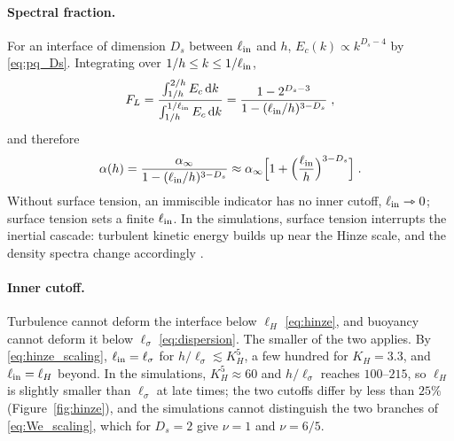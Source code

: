 \documentclass[11pt]{article}
\numberwithin{equation}{section}
\newcommand{\ls}{\ell_\sigma}
\begin{document}
\paragraph{Spectral fraction.} For an interface of dimension $D_s$ between $\ell_{\rm in}$ and $h$, $E_c(k) \propto k^{D_s - 4}$ by \eqref{eq:pq_Ds}. Integrating over $1/h \le k \le 1/\ell_{\rm in}$,
\begin{equation}\label{eq:FL}
F_L = \frac{\int_{1/h}^{2/h} E_c \, \mathrm d k}{\int_{1/h}^{1/\ell_{\rm in}} E_c \, \mathrm d k}
= \frac{1 - 2^{D_s - 3}}{1 - (\ell_{\rm in}/h)^{3 - D_s}} \;,
\end{equation}
and therefore
\begin{equation}\label{eq:alpha_closure}
\alpha(h) = \frac{\alpha_\infty}{1 - (\ell_{\rm in}/h)^{3 - D_s}} \approx
\alpha_\infty \Big[1 + \Big(\frac{\ell_{\rm in}}{h}\Big)^{3 - D_s}\Big] \;.
\end{equation}
Without surface tension, an immiscible indicator has no inner cutoff, $\ell_{\rm in} \rightarrowtriangle 0$; surface tension sets a finite $\ell_{\rm in}$. In the simulations, surface tension interrupts the inertial cascade: turbulent kinetic energy builds up near the Hinze scale, and the density spectra change accordingly \cite{Walker2027_2}.

\paragraph{Inner cutoff.} Turbulence cannot deform the interface below $\ell_H$ \eqref{eq:hinze}, and buoyancy cannot deform it below $\ls$ \eqref{eq:dispersion}. The smaller of the two applies. By \eqref{eq:hinze_scaling}, $\ell_{\rm in} = \ls$ for $h/\ls \lesssim K_H^5$, a few hundred for $K_H = 3.3$, and $\ell_{\rm in} = \ell_H$ beyond. In the simulations, $K_H^5 \approx 60$ and $h/\ls$ reaches $100$--$215$, so $\ell_H$ is slightly smaller than $\ls$ at late times; the two cutoffs differ by less than $25\%$ (Figure~\ref{fig:hinze}), and the simulations cannot distinguish the two branches of \eqref{eq:We_scaling}, which for $D_s = 2$ give $\nu = 1$ and $\nu = 6/5$.
\end{document}

